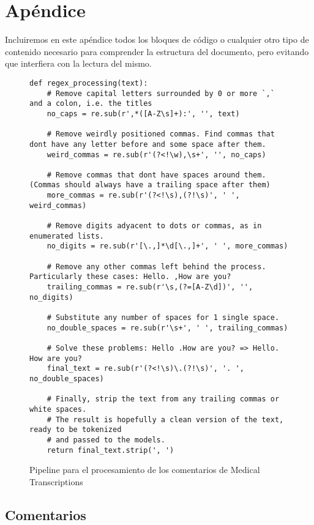 \appendix
\chapter{Apéndice}

Incluiremos en este apéndice todos los bloques de código o cualquier otro tipo de contenido necesario para comprender la estructura del documento, pero evitando que interfiera con la lectura del mismo.

\begin{figure}[h]
	\centering
	
	\begin{verbatim}
def regex_processing(text):
    # Remove capital letters surrounded by 0 or more `,` and a colon, i.e. the titles
    no_caps = re.sub(r',*([A-Z\s]+):', '', text)

    # Remove weirdly positioned commas. Find commas that dont have any letter before and some space after them.
    weird_commas = re.sub(r'(?<!\w),\s+', '', no_caps)
    
    # Remove commas that dont have spaces around them. (Commas should always have a trailing space after them)
    more_commas = re.sub(r'(?<!\s),(?!\s)', ' ', weird_commas)

    # Remove digits adyacent to dots or commas, as in enumerated lists.
    no_digits = re.sub(r'[\.,]*\d[\.,]+', ' ', more_commas)

    # Remove any other commas left behind the process. Particularly these cases: Hello. ,How are you?
    trailing_commas = re.sub(r'\s,(?=[A-Z\d])', '', no_digits)

    # Substitute any number of spaces for 1 single space.
    no_double_spaces = re.sub(r'\s+', ' ', trailing_commas)

    # Solve these problems: Hello .How are you? => Hello. How are you?
    final_text = re.sub(r'(?<!\s)\.(?!\s)', '. ', no_double_spaces)

    # Finally, strip the text from any trailing commas or white spaces.
    # The result is hopefully a clean version of the text, ready to be tokenized
    # and passed to the models.
    return final_text.strip(', ')
	\end{verbatim}

	\caption{Pipeline para el procesamiento de los comentarios de Medical Transcriptions}
	\label{code:pipeline-regex-mdtr}
\end{figure}


\section{Comentarios}
\label{sec:comments}

